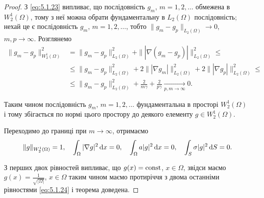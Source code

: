 \begin{proof}
    З \eqref{eq:5.1.23} випливає, що послідовність $g_m$, $m = 1, 2, \ldots$ обмежена в $W_2^1(\Omega)$, тому з неї можна обрати фундаментальну в $L_2(\Omega)$ послідовність; нехай це є послідовність $g_m$, $m = 1, 2, \ldots$, тобто $\|g_m - g_p\|_{L_2(\Omega)} \to 0$, $m, p \to \infty$. Розглянемо
    \begin{align*}
        \|g_m - g_p\|_{W_2^1(\Omega)}^2
        &= \|g_m - g_p\|_{L_2(\Omega)}^2 + \| |\nabla (g_m - g_p)| \|_{L_2(\Omega)}^2 \le \\
        &\le \|g_m - g_p\|_{L_2(\Omega)}^2 + 2 \| |\nabla g_m| \|_{L_2(\Omega)}^2 + 2 \| |\nabla g_p| \|_{L_2(\Omega)}^2 \le \\
        &\le \|g_m - g_p\|_{L_2(\Omega)}^2 + \frac{2}{m \gamma} + \frac{2}{p \gamma} \xrightarrow[p, m \to \infty]{} 0.
    \end{align*}

    Таким чином послідовність $g_m$, $m = 1, 2, \ldots$ фундаментальна в просторі $W_2^1(\Omega)$ і тому збігається по нормі цього простору до деякого елементу $g \in W_2^1(\Omega)$. \medskip 

    Переходимо до границі при $m \to \infty$, отримаємо
    \begin{equation}
        \label{eq:5.1.24}
        \|g\|_{W_2^1(\Omega)} = 1, \quad \int_\Omega |\nabla g|^2 \mathop{}\!\mathrm{d} x = 0, \quad \int_\Omega a |g|^2 \mathop{}\!\mathrm{d} x = 0, \quad \int_S \sigma |g|^2 \mathop{}\!\mathrm{d} S = 0.
    \end{equation}

    З перших двох рівностей випливає, що $g(x) = \operatorname{const}$, $x \in \Omega$, звідси маємо $g(x) = \frac{1}{\sqrt{|\Omega|}}$, $x \in \Omega$ таким чином маємо протиріччя з двома останніми рівностями \eqref{eq:5.1.24} і теорема доведена.
\end{proof}

